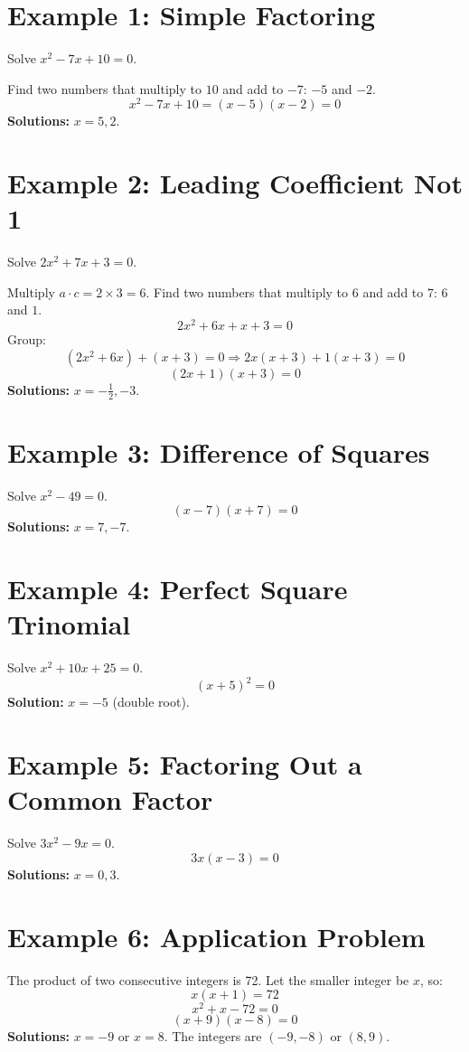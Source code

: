 \documentclass[14pt]{extarticle}
\begin{document}
\section*{Example 1: Simple Factoring}

Solve \(x^2 - 7x + 10 = 0.\)

Find two numbers that multiply to \(10\) and add to \(-7\): \(-5\) and \(-2.\)
\[
x^2 - 7x + 10 = (x - 5)(x - 2) = 0
\]
\textbf{Solutions:} \(x = 5, 2.\)

\section*{Example 2: Leading Coefficient Not 1}

Solve \(2x^2 + 7x + 3 = 0.\)

Multiply \(a \cdot c = 2 \times 3 = 6.\)  
Find two numbers that multiply to 6 and add to 7: \(6\) and \(1.\)
\[
2x^2 + 6x + x + 3 = 0
\]
Group:
\[
(2x^2 + 6x) + (x + 3) = 0 \Rightarrow 2x(x + 3) + 1(x + 3) = 0
\]
\[
(2x + 1)(x + 3) = 0
\]
\textbf{Solutions:} \(x = -\tfrac{1}{2}, -3.\)

\section*{Example 3: Difference of Squares}

Solve \(x^2 - 49 = 0.\)
\[
(x - 7)(x + 7) = 0
\]
\textbf{Solutions:} \(x = 7, -7.\)

\section*{Example 4: Perfect Square Trinomial}

Solve \(x^2 + 10x + 25 = 0.\)
\[
(x + 5)^2 = 0
\]
\textbf{Solution:} \(x = -5\) (double root).

\section*{Example 5: Factoring Out a Common Factor}

Solve \(3x^2 - 9x = 0.\)
\[
3x(x - 3) = 0
\]
\textbf{Solutions:} \(x = 0, 3.\)

\section*{Example 6: Application Problem}

The product of two consecutive integers is 72.  
Let the smaller integer be \(x\), so:
\[
x(x + 1) = 72
\]
\[
x^2 + x - 72 = 0
\]
\[
(x + 9)(x - 8) = 0
\]
\textbf{Solutions:} \(x = -9\) or \(x = 8.\)  
The integers are \((-9, -8)\) or \((8, 9).\)
\end{document}
